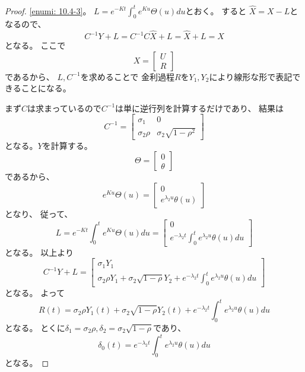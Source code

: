 \documentclass[uplatex]{jsarticle}
\theoremstyle{definition}
\begin{document}
\begin{proof}
  \ref{enumi: 10.4-3}。
  \(L=e^{-Kt}\int_0^te^{Ku}\Theta(u)du\)とおく。
  すると
  \(\hat{X} = X - L\)となるので、
  \[C^{-1}Y + L = C^{-1}C\hat{X} + L = \hat{X} + L = X\]
  となる。
  ここで
  \[
  X = \left[
  \begin{array}{c}
    U \\
    R
  \end{array}
  \right]
  \]
  であるから、
  \(L,C^{-1}\)を求めることで
  金利過程\(R\)を\(Y_1,Y_2\)により線形な形で表記できることになる。

  まず\(C\)は求まっているので\(C^{-1}\)は単に逆行列を計算するだけであり、
  結果は
  \[
  C^{-1} = \left[
  \begin{array}{cc}
    \sigma_1 & 0 \\
    \sigma_2\rho & \sigma_2\sqrt{1-\rho^2}
  \end{array}
  \right]
  \]
  となる。\(Y\)を計算する。
  \[
  \Theta = \left[
  \begin{array}{c}
    0 \\
    \theta
  \end{array}
  \right]
  \]
  であるから、
  \[
  e^{Ku}\Theta(u) = \left[
  \begin{array}{c}
    0 \\
    e^{\lambda_2u}\theta(u)
  \end{array}
  \right]
  \]
  となり、
  従って、
  \[
  L = e^{-Kt}\int_0^te^{Ku}\Theta(u)du = \left[
  \begin{array}{c}
    0 \\
    e^{-\lambda_2t}\int_0^te^{\lambda_2u}\theta(u)du
  \end{array}
  \right]
  \]
  となる。
  以上より
  \[
  C^{-1}Y + L = \left[
  \begin{array}{c}
    \sigma_1Y_1 \\
    \sigma_2\rho Y_1 + \sigma_2\sqrt{1-\rho}Y_2 + e^{-\lambda_2t}\int_0^te^{\lambda_2u}\theta(u)du
  \end{array}
  \right]
  \]
  となる。
  よって
  \[
  R(t) = \sigma_2\rho Y_1(t) + \sigma_2\sqrt{1-\rho}Y_2(t) + e^{-\lambda_2t}\int_0^te^{\lambda_2u}\theta(u)du
  \]
  となる。
  とくに\(\delta_1 = \sigma_2\rho, \delta_2 = \sigma_2\sqrt{1-\rho}\)であり、
  \[
  \delta_0(t) = e^{-\lambda_2t}\int_0^te^{\lambda_2u}\theta(u)du
  \]
  となる。
\end{proof}
\end{document}
